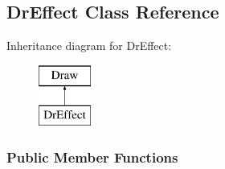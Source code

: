\hypertarget{classDrEffect}{}\subsection{Dr\+Effect Class Reference}
\label{classDrEffect}
Inheritance diagram for Dr\+Effect\+:\begin{figure}[H]
\begin{center}
\leavevmode
\includegraphics[height=2.000000cm]{classDrEffect}
\end{center}
\end{figure}
\subsubsection*{Public Member Functions}

